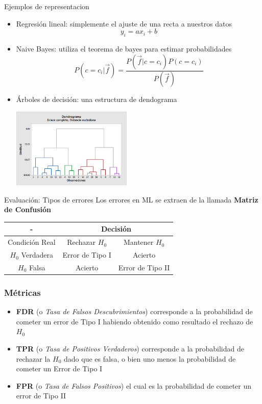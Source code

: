 \documentclass[11pt]{beamer}
\begin{document}
\begin{frame}{Ejemplos de representacion}
\begin{itemize}[<+->]
    \item Regresi\'on lineal: simplemente el ajuste de una recta a nuestros datos $$y_i = a x_i + b$$
    \item Naive Bayes: utiliza el teorema de bayes para estimar probabilidades
    $$P(c=c_i|\vec{f}) = \frac{P(\vec{f}|c=c_i)P(c=c_i)}{P(\vec{f})}$$
    \item \'Arboles de decisi\'on: una estructura de dendograma
    \begin{center}
    \includegraphics[width=0.45\textwidth]{images/cluster_obs_dendrogram_with_final_partition_glove_testers.png}    
    \end{center}
\end{itemize}    
\end{frame}



\begin{frame}{Evaluaci\'on: Tipos de errores}
Los errores en ML se extraen de la llamada \textbf{Matriz de Confusi\'on}
\small
\begin{center}
\begin{tabular}{|c|c|l|}
\hline
- & \multicolumn{2}{c|}{Decisi\'on}\\
\hline \hline
Condici\'on Real & Rechazar $H_0$ & \multicolumn{1}{c|}{Mantener $H_0$}\\
\hline
$H_0$ Verdadera & Error de Tipo I & \multicolumn{1}{c|}{Acierto}\\
\hline
$H_0$ Falsa & Acierto & \multicolumn{1}{c|}{Error de Tipo II}\\
\hline
\end{tabular}
\end{center}
\end{frame}

\begin{frame} \frametitle{M\'etricas}
 \small
\begin{itemize}
 \item \textbf{FDR} (o \textit{Tasa de Falsos Descubrimientos}) corresponde a la probabilidad 
 de cometer un error de Tipo I habiendo obtenido como resultado el rechazo de $H_0$
 \item \textbf{TPR} (o \textit{Tasa de Positivos Verdaderos}) corresponde a la probabilidad de 
 rechazar la $H_0$ dado que es falsa, o bien uno menos la probabilidad de cometer un Error de Tipo I
\item \textbf{FPR} (o \textit{Tasa de Falsos Positivos}) el cual es la probabilidad de cometer un error de Tipo II
\end{itemize}
\end{frame}
\end{document}

